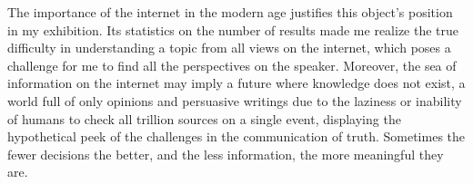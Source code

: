 \documentclass[a4paper,11pt]{article}
\begin{document}

The importance of the internet in the modern age justifies this object's position in my exhibition. Its statistics on the number of results made me realize the true difficulty in understanding a topic from all views on the internet, which poses a challenge for me to find all the perspectives on the speaker. Moreover, the sea of information on the internet may imply a future where knowledge does not exist, a world full of only opinions and persuasive writings due to the laziness or inability of humans to check all trillion sources on a single event, displaying the hypothetical peek of the challenges in the communication of truth. Sometimes the fewer decisions the better, and the less information, the more meaningful they are.




\newpage
\printbibliography

\end{document}
